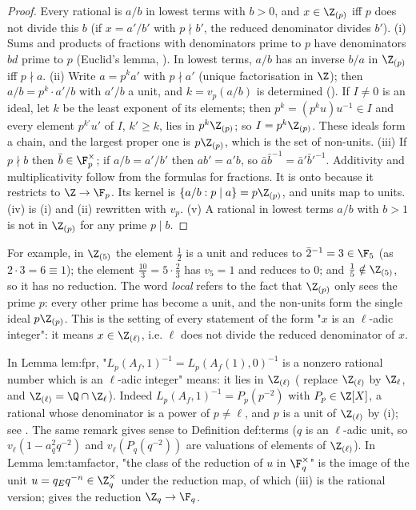 \begin{proof}
Every rational is $a/b$ in lowest terms with $b>0$, and $x\in\Z_{(p)}$ iff $p$ does not divide this $b$ (if $x=a'/b'$ with $p\nmid b'$, the
reduced denominator divides $b'$). (i) Sums and products of fractions with denominators prime to $p$ have denominators
$bd$ prime to $p$ (Euclid's lemma, ). In lowest terms, $a/b$ has an inverse $b/a$ in $\Z_{(p)}$ iff $p\nmid a$.
(ii) Write $a=p^ka'$ with $p\nmid a'$ (unique factorisation in $\Z$); then $a/b=p^k\cdot a'/b$ with $a'/b$ a unit, and $k=v_p(a/b)$ is
determined (). If $I\ne0$ is an ideal, let $k$ be the least exponent of its elements; then $p^k=(p^ku)u^{-1}\in I$
and every element $p^{k'}u'$ of $I$, $k'\ge k$, lies in $p^k\Z_{(p)}$; so $I=p^k\Z_{(p)}$. These ideals form a chain, and the largest proper one
is $p\Z_{(p)}$, which is the set of non-units.
(iii) If $p\nmid b$ then $\bar b\in\F_p^\times$; if $a/b=a'/b'$ then $ab'=a'b$, so $\bar a\bar b^{-1}=\bar a'\bar b'^{-1}$. Additivity and
multiplicativity follow from the formulas for fractions. It is onto because it restricts to $\Z\to\F_p$. Its kernel is
$\{a/b:p\mid a\}=p\Z_{(p)}$, and units map to units.
(iv) is (i) and (ii) rewritten with $v_p$. (v) A rational in lowest terms $a/b$ with $b>1$ is not in $\Z_{(p)}$ for any prime $p\mid b$.
\end{proof}

For example, in $\Z_{(5)}$ the element $\frac12$ is a unit and reduces to $\bar2^{-1}=3\in\F_5$ (as $2\cdot3=6\equiv1$); the element $\frac{10}3=5\cdot\frac23$ has $v_5=1$ and
reduces to $0$; and $\frac15\notin\Z_{(5)}$, so it has no reduction. The word \emph{local} refers to the fact that $\Z_{(p)}$ only sees the prime $p$:
every other prime has become a unit, and the non-units form the single ideal $p\Z_{(p)}$. This is the setting of every statement of the form
"$x$ is an $\ell$-adic integer": it means $x\in\Z_{(\ell)}$, i.e. $\ell$ does not divide the reduced denominator of $x$.

\begin{paperlink}\label{pl:rings:fpr}
In Lemma lem:fpr, "$L_p(A_f,1)^{-1}=L_p(A_f(1),0)^{-1}$ is a nonzero rational number which is an $\ell$-adic integer" means: it lies in
$\Z_{(\ell)}$ ( replace $\Z_{(\ell)}$ by $\Z_\ell$, and $\Z_{(\ell)}=\Q\cap\Z_\ell$). Indeed $L_p(A_f,1)^{-1}=P_p(p^{-2})$ with $P_p\in\Z[X]$,
a rational whose denominator is a power of $p\ne\ell$, and $p$ is a unit of $\Z_{(\ell)}$ by (i); see
. The same remark gives sense to Definition def:terms ($q$ is an $\ell$-adic unit, so
$v_\ell(1-a_q^2q^{-2})$ and $v_\ell(P_q(q^{-2}))$ are valuations of elements of $\Z_{(\ell)}$). In Lemma lem:tamfactor, "the class of the
reduction of $u$ in $\F_q^\times$" is the image of the unit $u=q_Eq^{-n}\in\Z_q^\times$ under the reduction map, of which
(iii) is the rational version;  gives the reduction $\Z_q\to\F_q$.
\end{paperlink}

